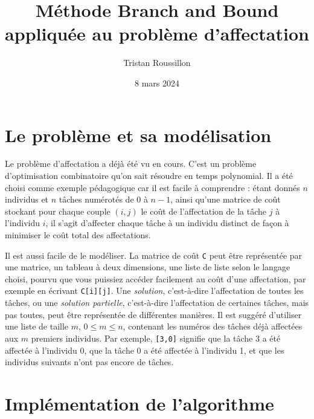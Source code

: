 \documentclass[a4paper,francais]{article}
\title{Méthode Branch and Bound appliquée au problème d'affectation}
\author{Tristan Roussillon}
\date{8 mars 2024}
\theoremstyle{definition}
\begin{document}
\maketitle

\section{Le problème et sa modélisation}

Le problème d'affectation a déjà été vu en cours. C'est un problème
d'optimisation combinatoire qu'on sait résoudre en temps polynomial.
Il a été choisi comme exemple pédagogique car il est facile à comprendre :
étant donnés $n$ individus et $n$ tâches numérotés de $0$ à $n-1$,
ainsi qu'une matrice de coût stockant pour chaque
couple $(i,j)$ le coût de l'affectation de la tâche $j$ à l'individu $i$,
il s'agit d'affecter chaque tâche à un individu distinct de façon à minimiser
le coût total des affectations.

Il est aussi facile de le modéliser. 
La matrice de coût \verb+C+ peut être représentée par une matrice,
un tableau à deux dimensions, une liste de liste selon le langage choisi,
pourvu que vous puissiez accéder facilement au coût d'une affectation,
par exemple en écrivant \verb+C[i][j]+. Une \emph{solution}, c'est-à-dire
l'affectation de toutes les tâches, ou une \emph{solution partielle},
c'est-à-dire l'affectation de certaines tâches, mais pas toutes, peut
être représentée de différentes manières. Il est suggéré d'utiliser
une liste de taille $m$, $0 \leq m \leq n$, contenant les
numéros des tâches déjà affectées aux $m$ premiers individus. Par
exemple, \verb+[3,0]+ signifie que la tâche 3 a été affectée à l'individu
0, que la tâche 0 a été affectée à l'individu 1, et que les individus
suivants n'ont pas encore de tâches. 

\section{Implémentation de l'algorithme}
\end{document}
